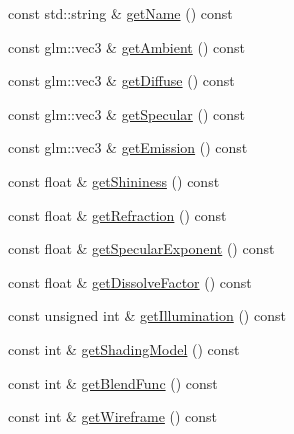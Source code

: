 \begin{DoxyCompactItemize}
\item 
const std\+::string \& \hyperlink{class_material_ab51bcfb064df3fa0ec1a5062e873fe49}{get\+Name} () const
\item 
const glm\+::vec3 \& \hyperlink{class_material_a61bafc60f2755cc546f3a6dc5736a6ae}{get\+Ambient} () const
\item 
const glm\+::vec3 \& \hyperlink{class_material_a6d7a33e9240d886dd6e62782e380f05e}{get\+Diffuse} () const
\item 
const glm\+::vec3 \& \hyperlink{class_material_a1781994da525d08bfb6d48187274d0a6}{get\+Specular} () const
\item 
const glm\+::vec3 \& \hyperlink{class_material_a3c58519af3fdbf5bc3f5a6e1712d8fc6}{get\+Emission} () const
\item 
const float \& \hyperlink{class_material_ae33424535bcfceb95632e09492d33972}{get\+Shininess} () const
\item 
const float \& \hyperlink{class_material_a3c90133f63f8ac1ba05359461234b6a7}{get\+Refraction} () const
\item 
const float \& \hyperlink{class_material_a4087dd55f6d034d3011dafeeeed1ad2d}{get\+Specular\+Exponent} () const
\item 
const float \& \hyperlink{class_material_ae615c797e56c8ad228888e8f21fd8223}{get\+Dissolve\+Factor} () const
\item 
const unsigned int \& \hyperlink{class_material_a30f8ed7054d7f09c42642b28e96a6635}{get\+Illumination} () const
\item 
const int \& \hyperlink{class_material_a50ad1d1911490e2458f841b4e8195823}{get\+Shading\+Model} () const
\item 
const int \& \hyperlink{class_material_ac8bb3627639e5454d58e9a9553ed1654}{get\+Blend\+Func} () const
\item 
const int \& \hyperlink{class_material_ad1be512566174cd3b091a6e3479a2440}{get\+Wireframe} () const
\end{DoxyCompactItemize}


